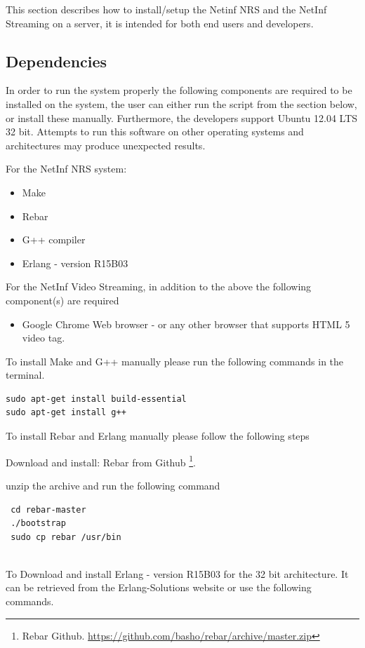 This section describes how to install/setup the Netinf NRS and the NetInf Streaming on a server, it is intended for both end users and developers.


\subsection{Dependencies}

In order to run the system properly the following components are required to be installed on the system, the user can either run the script from the section below, or install these manually. Furthermore, the developers support Ubuntu 12.04 LTS 32 bit. Attempts to run this software on other operating systems and architectures may produce unexpected results.


For the NetInf NRS system:
\begin{itemize}
\item Make
\item Rebar
\item G++ compiler
\item Erlang - version R15B03
\end{itemize}

For the NetInf Video Streaming, in addition to the above the following component(s) are required
\begin{itemize}
\item Google Chrome Web browser - or any other browser that supports HTML 5 video tag.
\end{itemize}

To install Make and G++ manually please run the following commands in the terminal.
\begin{verbatim}
sudo apt-get install build-essential
sudo apt-get install g++
\end{verbatim}

To install Rebar and Erlang manually please follow the following steps

Download and install: Rebar from Github \footnote{Rebar Github. \url{https://github.com/basho/rebar/archive/master.zip}}.


unzip the archive and run the following command
\begin{verbatim}
 cd rebar-master
 ./bootstrap
 sudo cp rebar /usr/bin
 
\end{verbatim}

To Download and install Erlang - version R15B03 for the 32 bit architecture.
It can be retrieved from the Erlang-Solutions website or use the following commands.

